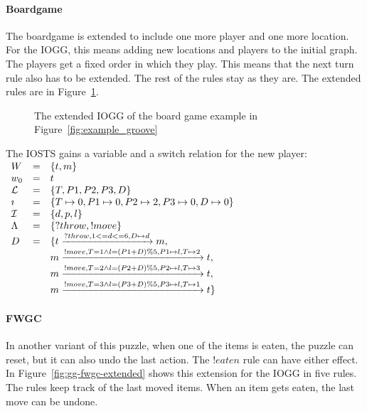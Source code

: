 \paragraph*{Boardgame}
The boardgame is extended to include one more player and one more location. For the IOGG, this means adding new locations and players to the initial graph. The players get a fixed order in which they play. This means that the next turn rule also has to be extended. The rest of the rules stay as they are. The extended rules are in Figure~\ref{fig:gg-bg-extended}.

\begin{figure}[ht]
  \begin{center}
    \hspace{20px}
  \end{center}
  \caption{The extended IOGG of the board game example in Figure~\ref{fig:example_groove}}
  \label{fig:gg-bg-extended}
\end{figure}

The IOSTS gains a variable and a switch relation for the new player:
\vspace{5px} \\
$\begin{array}{lcl}
W & = & \{t, m\} \\
w_0 & = & t \\
\mathcal{L} & = & \{T, P1, P2, P3, D\} \\
\imath & = & \{T \mapsto 0, P1 \mapsto 0, P2 \mapsto 2, P3 \mapsto 0, D \mapsto 0\} \\
\mathcal{I} & = & \{d, p, l\} \\
\Lambda & = & \{?throw, !move\} \\
D & = & \{t\xrightarrow{?throw, 1 <= d <= 6, D \mapsto d}m, \\
 & & m\xrightarrow{!move, T=1 \land l=(P1+D)\%5, P1 \mapsto l, T \mapsto 2}t, \\
 & & m\xrightarrow{!move, T=2 \land l=(P2+D)\%5, P2 \mapsto l, T \mapsto 3}t, \\
 & & m\xrightarrow{!move, T=3 \land l=(P3+D)\%5, P3 \mapsto l, T \mapsto 1}t\}
\end{array}$

\paragraph*{FWGC}
In another variant of this puzzle, when one of the items is eaten, the puzzle can reset, but it can also undo the last action. The $\mathit{!eaten}$ rule can have either effect. In Figure~\ref{fig:gg-fwgc-extended} shows this extension for the IOGG in five rules. The rules keep track of the last moved items. When an item gets eaten, the last move can be undone.

